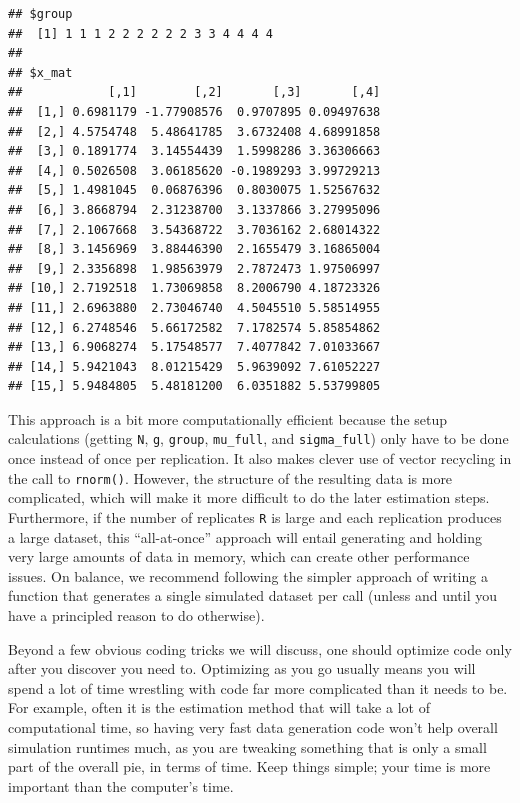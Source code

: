 \documentclass[
]{book}
\begin{document}
\begin{verbatim}
## $group
##  [1] 1 1 1 2 2 2 2 2 2 3 3 4 4 4 4
## 
## $x_mat
##            [,1]        [,2]       [,3]       [,4]
##  [1,] 0.6981179 -1.77908576  0.9707895 0.09497638
##  [2,] 4.5754748  5.48641785  3.6732408 4.68991858
##  [3,] 0.1891774  3.14554439  1.5998286 3.36306663
##  [4,] 0.5026508  3.06185620 -0.1989293 3.99729213
##  [5,] 1.4981045  0.06876396  0.8030075 1.52567632
##  [6,] 3.8668794  2.31238700  3.1337866 3.27995096
##  [7,] 2.1067668  3.54368722  3.7036162 2.68014322
##  [8,] 3.1456969  3.88446390  2.1655479 3.16865004
##  [9,] 2.3356898  1.98563979  2.7872473 1.97506997
## [10,] 2.7192518  1.73069858  8.2006790 4.18723326
## [11,] 2.6963880  2.73046740  4.5045510 5.58514955
## [12,] 6.2748546  5.66172582  7.1782574 5.85854862
## [13,] 6.9068274  5.17548577  7.4077842 7.01033667
## [14,] 5.9421043  8.01215429  5.9639092 7.61052227
## [15,] 5.9484805  5.48181200  6.0351882 5.53799805
\end{verbatim}

This approach is a bit more computationally efficient because the setup calculations (getting \texttt{N}, \texttt{g}, \texttt{group}, \texttt{mu\_full}, and \texttt{sigma\_full}) only have to be done once instead of once per replication. It also makes clever use of vector recycling in the call to \texttt{rnorm()}. However, the structure of the resulting data is more complicated, which will make it more difficult to do the later estimation steps.
Furthermore, if the number of replicates \texttt{R} is large and each replication produces a large dataset, this ``all-at-once'' approach will entail generating and holding very large amounts of data in memory, which can create other performance issues.
On balance, we recommend following the simpler approach of writing a function that generates a single simulated dataset per call (unless and until you have a principled reason to do otherwise).

Beyond a few obvious coding tricks we will discuss, one should optimize code only after you discover you need to.
Optimizing as you go usually means you will spend a lot of time wrestling with code far more complicated than it needs to be.
For example, often it is the estimation method that will take a lot of computational time, so having very fast data generation code won't help overall simulation runtimes much, as you are tweaking something that is only a small part of the overall pie, in terms of time.
Keep things simple; your time is more important than the computer's time.
\end{document}

